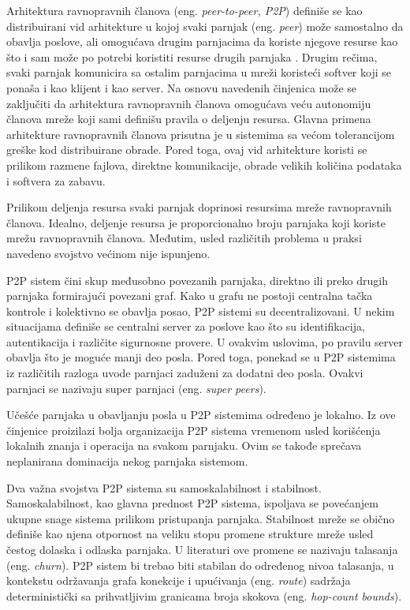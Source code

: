 \documentclass[12pt,oneside]{memoir}
\begin{document}
Arhitektura ravnopravnih članova (eng. \textit{peer-to-peer, P2P}) definiše se kao distribuirani vid arhitekture u kojoj svaki parnjak (eng. \textit{peer}) može samostalno da obavlja poslove, ali omogućava drugim parnjacima da koriste njegove resurse kao što i sam može po potrebi koristiti resurse drugih parnjaka \cite{Shen:2009}. Drugim rečima, svaki parnjak komunicira sa ostalim parnjacima u mreži koristeći softver koji se ponaša i kao klijent i kao server. Na osnovu navedenih činjenica može se zaključiti da arhitektura ravnopravnih članova omogućava veću autonomiju članova mreže koji sami definišu pravila o deljenju resursa. Glavna primena arhitekture ravnopravnih članova prisutna je u sistemima sa većom tolerancijom greške kod distribuirane obrade. Pored toga, ovaj vid arhitekture koristi se prilikom razmene fajlova, direktne komunikacije, obrade velikih količina podataka i softvera za zabavu. 


Prilikom deljenja resursa svaki parnjak doprinosi resursima mreže ravnopravnih članova. Idealno, deljenje resursa je proporcionalno broju parnjaka koji koriste mrežu ravnopravnih članova. Međutim, usled različitih problema u praksi navedeno svojstvo većinom nije ispunjeno. 

P2P sistem čini skup međusobno povezanih parnjaka, direktno ili preko drugih parnjaka formirajući povezani graf. Kako u grafu ne postoji centralna tačka kontrole i kolektivno se obavlja posao, P2P sistemi su decentralizovani. U nekim situacijama definiše se centralni server za poslove kao što su identifikacija, autentikacija i različite sigurnosne provere. U ovakvim uslovima, po pravilu server obavlja što je moguće manji deo posla. Pored toga, ponekad se u P2P sistemima iz različitih razloga uvode parnjaci zaduženi za dodatni deo posla.
Ovakvi parnjaci se nazivaju super parnjaci (eng. \textit{super peers}).


Učešće parnjaka u obavljanju posla u P2P sistemima određeno je lokalno. Iz ove činjenice proizilazi bolja organizacija P2P sistema vremenom usled korišćenja lokalnih znanja i operacija na svakom parnjaku. Ovim se takođe sprečava neplanirana dominacija nekog parnjaka sistemom.

Dva važna svojstva P2P sistema su samoskalabilnost i stabilnost. 
Samoskalabilnost, kao glavna prednost P2P sistema,
ispoljava se povećanjem ukupne snage sistema prilikom pristupanja parnjaka. Stabilnost mreže se obično definiše kao njena otpornost na veliku stopu promene strukture mreže usled čestog dolaska i odlaska parnjaka. U literaturi ove promene se nazivaju talasanja (eng. \textit{churn}). P2P sistem bi trebao biti stabilan do određenog nivoa talasanja, u kontekstu održavanja grafa konekcije i upućivanja (eng. \textit{route}) sadržaja deterministički sa prihvatljivim granicama broja skokova (eng. \textit{hop-count bounds}).
\end{document}
